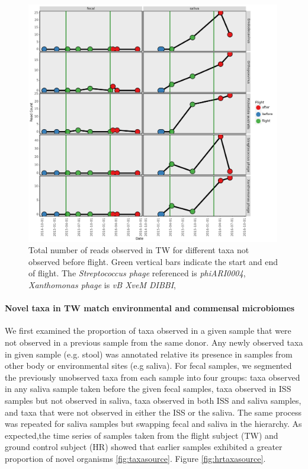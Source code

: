 \begin{figure}
  \begin{center}
    \includegraphics[width=0.99\textwidth]{figs/tw_flight_taxa.png}
	\caption{\small{
	    Total number of reads observed in TW for different taxa not observed before flight. Green vertical bars indicate the start and end of flight. The \textit{Streptococcus phage} referenced is \textit{phiARI0004}, \textit{Xanthomonas phage} is \textit{vB XveM DIBBI},
	}}
    \label{fig:flighttaxa}
  \end{center}
\end{figure}



\paragraph{Novel taxa in TW match environmental and commensal microbiomes}

We first examined the proportion of taxa observed in a given sample that were not observed in a previous sample from the same donor. Any newly observed taxa in given sample (e.g. stool) was annotated relative its presence in samples from other body or environmental sites (e.g saliva). For fecal samples, we segmented the previously unobserved taxa from each sample into four groups: taxa observed in any saliva sample taken before the given fecal samples, taxa observed in ISS samples but not observed in saliva, taxa observed in both ISS and saliva samples, and taxa that were not observed in either the ISS or the saliva. The same process was repeated for saliva samples but swapping fecal and saliva in the hierarchy. As expected,the time series of samples taken from the flight subject (TW) and ground control subject (HR) showed that earlier samples exhibited a greater proportion of novel organisms \ref{fig:taxasource}. Figure \ref{fig:hrtaxasource}. 

